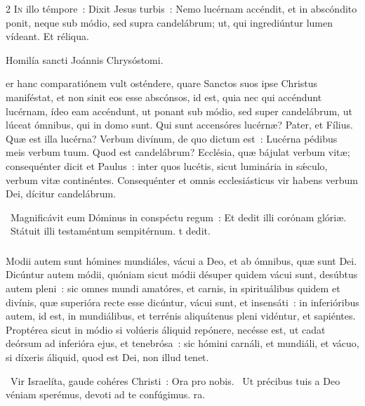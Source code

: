 \documentclass[9pt,twoside]{extarticle}
\begin{document}
\begin{multicols}{2}
\lettrine{I}n illo témpore~: Dixit Jesus turbis~: Nemo lucérnam accéndit, et in abscóndito ponit, neque sub módio, sed supra candelábrum; ut, qui ingrediúntur lumen vídeant. Et réliqua.

\begin{center}Homilía sancti Joánnis Chrysóstomi.\\
\end{center}

er hanc comparatiónem vult osténdere, quare Sanctos suos ipse Christus maniféstat, et non sinit eos esse abscónsos, id est, quia nec qui accéndunt lucérnam, ídeo eam accéndunt, ut ponant sub módio, sed super candelábrum, ut lúceat ómnibus, qui in domo sunt. Qui sunt accensóres lucérnæ? Pater, et Fílius. Quæ est illa lucérna? Verbum divínum, de quo dictum est~: Lucérna pédibus meis verbum tuum. Quod est candelábrum? Ecclésia, quæ bájulat verbum vitæ; consequénter dicit et Paulus~: inter quos lucétis, sicut luminária in sǽculo, verbum vitæ continéntes. Consequénter et omnis ecclesiásticus vir habens verbum Dei, dícitur candelábrum.

\begin{tightlist}{}
\item {}~Magnificávit eum Dóminus in conspéctu regum~: \textred{*} Et dedit illi corónam glóriæ. ~Státuit illi testaméntum sempitérnum. t dedit.
\end{tightlist}

\subsubsection*{\center{}}
\lettrine{M}odii autem sunt hómines mundiáles, vácui a Deo, et ab ómnibus, quæ sunt Dei. Dicúntur autem módii, quóniam sicut módii désuper quidem vácui sunt, desúbtus autem pleni~: sic omnes mundi amatóres, et carnis, in spirituálibus quidem et divínis, quæ superióra recte esse dicúntur, vácui sunt, et insensáti~: in inferióribus autem, id est, in mundiálibus, et terrénis aliquátenus pleni vidéntur, et sapiéntes. Proptérea sicut in módio si volúeris áliquid repónere, necésse est, ut cadat deórsum ad inferióra ejus, et tenebrósa~: sic hómini carnáli, et mundiáli, et vácuo, si díxeris áliquid, quod est Dei, non illud tenet.

\begin{tightlist}{}
\item {}~Vir Israelíta, gaude cohéres Christi~: \textred{*} Ora pro nobis. ~Ut précibus tuis a Deo véniam sperémus, devoti ad te confúgimus. ra.
\end{tightlist}


\end{multicols}
\end{document}
